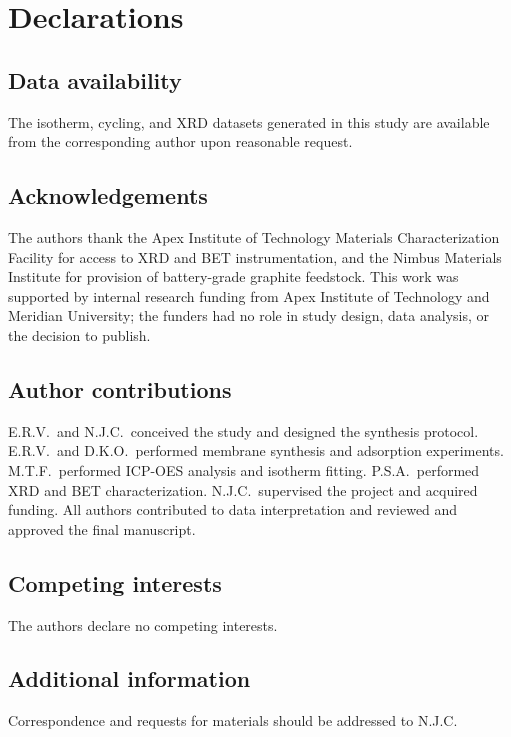 \section{Declarations}

\subsection{Data availability}
The isotherm, cycling, and XRD datasets generated in this study are available from the corresponding author upon reasonable request.

\subsection{Acknowledgements}
The authors thank the Apex Institute of Technology Materials Characterization Facility for access to XRD and BET instrumentation, and the Nimbus Materials Institute for provision of battery-grade graphite feedstock. This work was supported by internal research funding from Apex Institute of Technology and Meridian University; the funders had no role in study design, data analysis, or the decision to publish.

\subsection{Author contributions}
E.R.V.\ and N.J.C.\ conceived the study and designed the synthesis protocol. E.R.V.\ and D.K.O.\ performed membrane synthesis and adsorption experiments. M.T.F.\ performed ICP-OES analysis and isotherm fitting. P.S.A.\ performed XRD and BET characterization. N.J.C.\ supervised the project and acquired funding. All authors contributed to data interpretation and reviewed and approved the final manuscript.

\subsection{Competing interests}
The authors declare no competing interests.

\subsection{Additional information}
Correspondence and requests for materials should be addressed to N.J.C.
